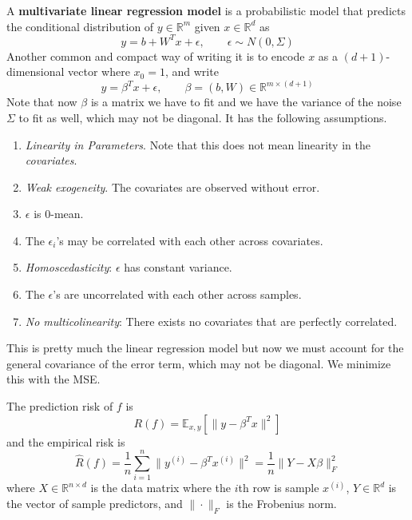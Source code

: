  \begin{definition} 
    A \textbf{multivariate linear regression model} is a probabilistic model that predicts the conditional distribution of $y \in \mathbb{R}^{m}$ given $x \in \mathbb{R}^d$ as 
    \begin{equation}
      y = b + W^T x + \epsilon, \qquad \epsilon \sim N(0, \Sigma)
    \end{equation}
    Another common and compact way of writing it is to encode $x$ as a $(d+1)$-dimensional vector where $x_0 = 1$, and write 
    \begin{equation}
      y = \beta^T x + \epsilon, \qquad \beta = (b, W) \in \mathbb{R}^{m \times (d+1)}
    \end{equation}
    Note that now $\beta$ is a matrix we have to fit and we have the variance of the noise $\Sigma$ to fit as well, which may not be diagonal. It has the following assumptions.
    \begin{enumerate}
      \item \textit{Linearity in Parameters}. Note that this does not mean linearity in the \textit{covariates}.
      \item \textit{Weak exogeneity}. The covariates are observed without error. 
      \item $\epsilon$ is $0$-mean. 
      \item The $\epsilon_i$'s may be correlated with each other across covariates. 
      \item \textit{Homoscedasticity}: $\epsilon$ has constant variance. 
      \item The $\epsilon$'s are uncorrelated with each other across samples. 
      \item \textit{No multicolinearity}: There exists no covariates that are perfectly correlated. 
    \end{enumerate}
  \end{definition} 

  This is pretty much the linear regression model but now we must account for the general covariance of the error term, which may not be diagonal. We minimize this with the MSE. 

  \begin{lemma}[Risk]
    The prediction risk of $f$ is 
    \begin{equation}
      R(f) = \mathbb{E}_{x, y} \left[ \| y - \beta^T x \|^2 \right]
    \end{equation}
    and the empirical risk is 
    \begin{equation}
      \hat{R}(f) = \frac{1}{n} \sum_{i=1}^n \| y^{(i)} - \beta^T x^{(i)} \|^2 = \frac{1}{n} \|Y - X \beta\|_F^2
    \end{equation}
    where $X \in \mathbb{R}^{n \times d}$ is the data matrix where the $i$th row is sample $x^{(i)}$, $Y \in \mathbb{R}^d$ is the vector of sample predictors, and $\| \cdot \|_F$ is the Frobenius norm. 
  \end{lemma}

